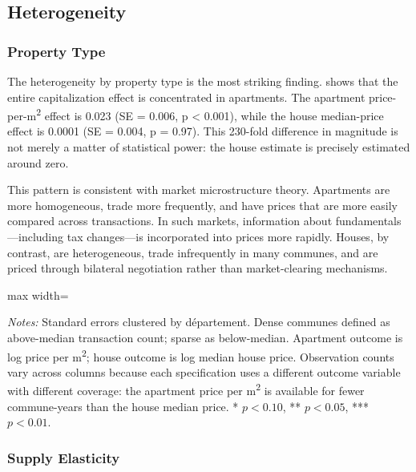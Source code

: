 \documentclass[12pt]{article}
\begin{document}
\subsection{Heterogeneity}

\subsubsection{Property Type}

The heterogeneity by property type is the most striking finding.  shows that the entire capitalization effect is concentrated in apartments. The apartment price-per-m\textsuperscript{2} effect is 0.023 (SE = 0.006, p < 0.001), while the house median-price effect is 0.0001 (SE = 0.004, p = 0.97). This 230-fold difference in magnitude is not merely a matter of statistical power: the house estimate is precisely estimated around zero.

This pattern is consistent with market microstructure theory. Apartments are more homogeneous, trade more frequently, and have prices that are more easily compared across transactions. In such markets, information about fundamentals---including tax changes---is incorporated into prices more rapidly. Houses, by contrast, are heterogeneous, trade infrequently in many communes, and are priced through bilateral negotiation rather than market-clearing mechanisms.

\begin{table}[H]
\centering
\caption{Heterogeneity: Property Type and Supply Elasticity}
\label{tab:het_property}
\begin{adjustbox}{max width=\textwidth}

\end{adjustbox}
\begin{tablenotes}[flushleft]
\small
\item \emph{Notes:} Standard errors clustered by d\'{e}partement. Dense communes defined as above-median transaction count; sparse as below-median. Apartment outcome is log price per m\textsuperscript{2}; house outcome is log median house price. Observation counts vary across columns because each specification uses a different outcome variable with different coverage: the apartment price per m\textsuperscript{2} is available for fewer commune-years than the house median price. * $p<0.10$, ** $p<0.05$, *** $p<0.01$.
\end{tablenotes}
\end{table}

\subsubsection{Supply Elasticity}
\end{document}
